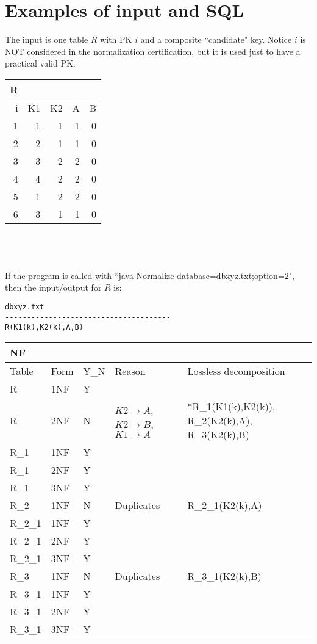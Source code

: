 \section{Examples of input and SQL}

The input is one table $R$ with PK $i$ and a composite ``candidate" key. Notice $i$ is NOT considered in the
normalization certification, but it is used just to have a practical valid PK.
\\	
\begin{tabular}{r r r r r}
R & & & & \\
\hline
i &K1 &K2 &A &B \\
\hline
1 &1 &1 &1 &0 \\
2 &2 &1 &1 &0 \\
3 &3 &2 &2 &0 \\
4 &4 &2 &2 &0 \\
5 &1 &2 &2 &0 \\
6 &3 &1 &1 &0 \\
\hline
\end{tabular}
\\
\\
\\
If the program is called with ``java Normalize database=dbxyz.txt;option=2", then the input/output for $R$ is:
\\
\begin{verbatim}
dbxyz.txt
--------------------------------------
R(K1(k),K2(k),A,B)
\end{verbatim}
\begin{tabular}{l l l l l}
NF & & \\
\hline
Table & Form & Y\_N & Reason & Lossless decomposition\\
\hline
R 				& 1NF 	& Y 		& 																				& 																			\\
R 				& 2NF 	& N 		& $K2 \rightarrow A$, $K2 \rightarrow B$, $K1 \rightarrow A$ 	&  *R\_1(K1(k),K2(k)), R\_2(K2(k),A), R\_3(K2(k),B)\\
R\_1			& 1NF		&	Y			&																					&																				\\
R\_1			& 2NF		&	Y			&																					&																				\\
R\_1			& 3NF		&	Y			&																					&																				\\
R\_2			&	1NF		& N			&	Duplicates															&	R\_2\_1(K2(k),A)													\\
R\_2\_1 	& 1NF		& Y			&																					&																				\\
R\_2\_1 	& 2NF		& Y			&																					&																				\\
R\_2\_1 	& 3NF		& Y			&																					&																				\\
R\_3			& 1NF 	& N			& Duplicates															& R\_3\_1(K2(k),B)													\\ 
R\_3\_1		& 1NF		& Y			&																					&																				\\
R\_3\_1		& 2NF		& Y			&																					&																				\\
R\_3\_1		& 3NF		& Y			&																					&																				\\
\hline
\end{tabular}

